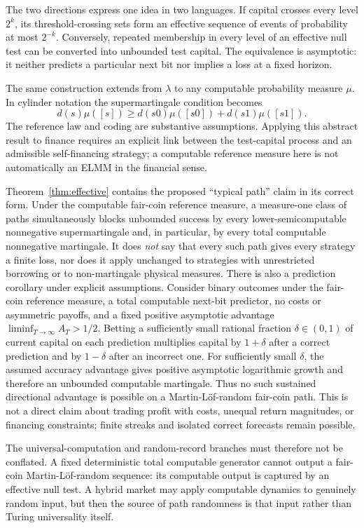 \documentclass[aps,pra,reprint,superscriptaddress,amsmath,amssymb,floatfix]{revtex4-2}
\theoremstyle{plain}
\theoremstyle{definition}
\theoremstyle{remark}
\begin{document}
The two directions express one idea in two languages. If capital crosses every
level \(2^k\), its threshold-crossing sets form an effective sequence of events
of probability at most \(2^{-k}\). Conversely, repeated membership in every
level of an effective null test can be converted into unbounded test capital.
The equivalence is asymptotic: it neither predicts a particular next bit nor
implies a loss at a fixed horizon.

The same construction extends from \(\lambda\) to any computable probability
measure \(\mu\). In cylinder notation the supermartingale condition becomes
\[
 d(s)\mu([s])\geq
 d(s0)\mu([s0])+d(s1)\mu([s1]).
\]
The reference law and coding are substantive assumptions. Applying this
abstract result to finance requires an explicit link between the test-capital
process and an admissible self-financing strategy; a computable reference
measure here is not automatically an ELMM in the financial sense.

Theorem~\ref{thm:effective} contains the proposed ``typical path'' claim in its
correct form. Under the computable fair-coin reference measure, a measure-one
class of paths
simultaneously blocks unbounded success by every lower-semicomputable
nonnegative supermartingale and, in particular, by every total computable
nonnegative martingale. It does \emph{not} say that every such path gives every
strategy a finite loss, nor does it apply unchanged to strategies with
unrestricted borrowing or to non-martingale physical measures.
There is also a prediction corollary under explicit assumptions. Consider
binary outcomes under the fair-coin reference measure, a total computable
next-bit predictor, no costs or asymmetric payoffs, and a fixed positive
asymptotic advantage \(\liminf_{T\to\infty}A_T>1/2\). Betting a sufficiently
small rational fraction \(\delta\in(0,1)\) of current capital on each
prediction multiplies capital by \(1+\delta\) after a correct prediction and
by \(1-\delta\) after an incorrect one. For sufficiently small \(\delta\), the
assumed accuracy advantage gives positive asymptotic logarithmic growth and
therefore an unbounded computable martingale. Thus no such sustained
directional advantage is possible on a Martin-L\"of-random fair-coin path.
This is not a direct claim about trading profit with costs, unequal return
magnitudes, or financing constraints; finite streaks and isolated correct
forecasts remain possible.

The universal-computation and random-record branches must therefore not be
conflated. A fixed deterministic total computable generator cannot output a
fair-coin Martin-L\"of-random sequence: its computable output is captured by an
effective null test. A hybrid market may apply computable dynamics to genuinely
random input, but then the source of path randomness is that input rather than
Turing universality itself.
\end{document}
